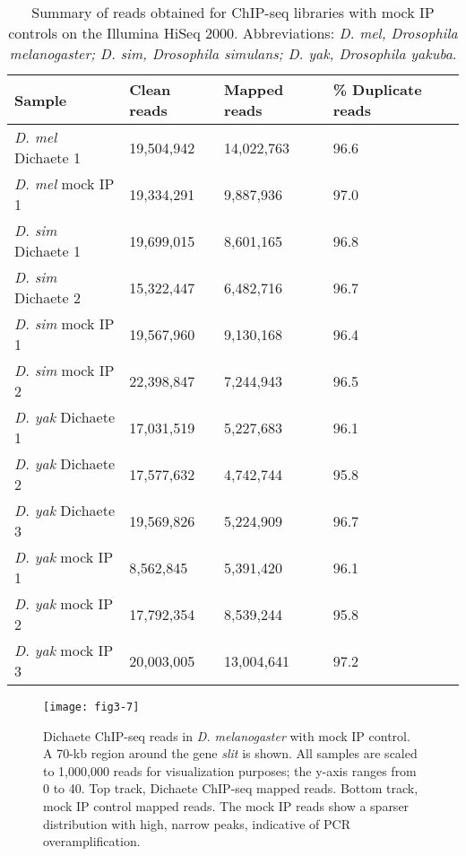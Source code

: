 \begin{table}[h]
\centering
\begin{tabular}{|l|l|l|l|}
\hline
\textbf{Sample}            & \textbf{Clean reads} & \textbf{Mapped reads} & \textbf{\% Duplicate reads} \\
\hline
\emph{D. mel} Dichaete 1 & 19,504,942  & 14,022,763   & 96.6               \\ \hline
\emph{D. mel} mock IP 1  & 19,334,291  & 9,887,936    & 97.0                 \\ \hline
\emph{D. sim} Dichaete 1 & 19,699,015  & 8,601,165    & 96.8               \\ \hline
\emph{D. sim} Dichaete 2 & 15,322,447  & 6,482,716    & 96.7               \\ \hline
\emph{D. sim} mock IP 1  & 19,567,960  & 9,130,168    & 96.4               \\ \hline
\emph{D. sim} mock IP 2  & 22,398,847  & 7,244,943    & 96.5               \\ \hline
\emph{D. yak} Dichaete 1 & 17,031,519  & 5,227,683    & 96.1               \\ \hline
\emph{D. yak} Dichaete 2 & 17,577,632  & 4,742,744    & 95.8               \\ \hline
\emph{D. yak} Dichaete 3 & 19,569,826  & 5,224,909    & 96.7               \\ \hline
\emph{D. yak} mock IP 1  & 8,562,845   & 5,391,420    & 96.1               \\ \hline
\emph{D. yak} mock IP 2  & 17,792,354  & 8,539,244    & 95.8               \\ \hline
\emph{D. yak} mock IP 3  & 20,003,005  & 13,004,641   & 97.2               \\ \hline
\end{tabular}
\caption{Summary of reads obtained for ChIP-seq libraries with mock IP controls on the Illumina HiSeq 2000. Abbreviations: \emph{D. mel, Drosophila melanogaster; D. sim, Drosophila simulans; D. yak, Drosophila yakuba}.}
\label{Table 3.2}
\end{table}

\begin{figure}
\centering
\texttt{[image: fig3-7]}
\caption[Dichaete ChIP-seq reads in \emph{D. melanogaster} with mock IP control]{Dichaete ChIP-seq reads in \emph{D. melanogaster} with mock IP control. A 70-kb region around the gene \emph{slit} is shown. All samples are scaled to 1,000,000 reads for visualization purposes; the y-axis ranges from 0 to 40. Top track, Dichaete ChIP-seq mapped reads. Bottom track, mock IP control mapped reads. The mock IP reads show a sparser distribution with high, narrow peaks, indicative of PCR overamplification.}
\label{Figure 3.7}
\end{figure}

